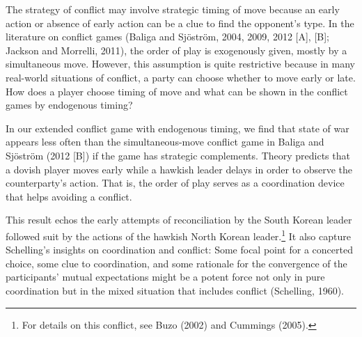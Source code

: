 \documentclass[12pt,english]{article}
\begin{document}
The strategy of conflict may involve strategic timing of move because an early action or absence of early action can be a clue to find the opponent's type. In the literature on conflict games (Baliga and Sj\"ostr\"om, 2004, 2009, 2012 [A], [B]; Jackson and Morrelli, 2011), the order of play is exogenously given, mostly by a simultaneous move. However, this assumption is quite restrictive because in many real-world situations of conflict, a party can choose whether to move early or late.  How does a player choose timing of move and what can be shown in the conflict games by endogenous timing? \par
In our extended conflict game with endogenous timing, we find that state of war appears less often than the simultaneous-move conflict game in Baliga and Sj\"ostr\"om (2012 [B]) if the game has strategic complements. Theory predicts that a dovish player moves early while a hawkish leader delays in order to observe the counterparty's action. That is, the order of play serves as a coordination device that helps avoiding a conflict.\par 
This result echos the early attempts of reconciliation by the South Korean leader followed suit by the actions of the hawkish North Korean leader.\footnote{For details on this conflict, see Buzo (2002) and Cummings (2005).}  It also capture Schelling's insights on coordination and conflict: Some focal point for a concerted choice, some clue to coordination, and some rationale for the convergence of the participants' mutual expectations might be a potent force not only in pure coordination but in the mixed situation that includes conflict (Schelling, 1960).\par  %
\end{document}
